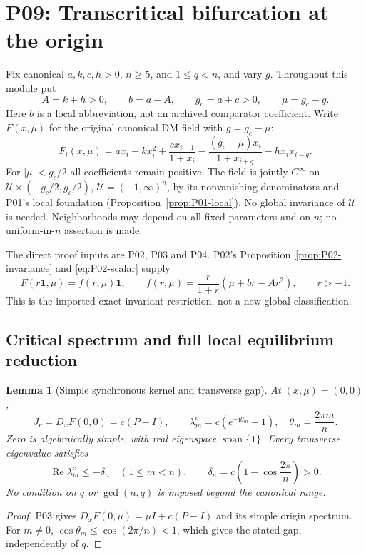 \documentclass[11pt]{article}
\newcommand{\one}{\mathbf{1}}
\newcommand{\ii}{\mathrm{i}}
\newcommand{\Domain}{\mathcal{U}}
\DeclareMathOperator{\Ree}{Re}
\newtheorem{lemma}[theorem]{Lemma}
\theoremstyle{definition}
\theoremstyle{remark}
\begin{document}
\section{P09: Transcritical bifurcation at the origin}
\label{sec:P09}

Fix canonical $a,k,c,h>0$, $n\ge5$, and $1\le q<n$, and vary $g$.
Throughout this module put
\begin{equation}
 A=k+h>0,\qquad b=a-A,\qquad g_c=a+c>0,\qquad \mu=g_c-g.
 \label{eq:P09-parameters}
\end{equation}
Here $b$ is a local abbreviation, not an archived comparator coefficient.
Write $F(x,\mu)$ for the original canonical DM field with $g=g_c-\mu$:
\begin{equation}
 F_i(x,\mu)=a x_i-kx_i^2+\frac{c x_{i-1}}{1+x_i}
 -\frac{(g_c-\mu)x_i}{1+x_{i+q}}-h x_i x_{i-q}.
 \label{eq:P09-field}
\end{equation}
For $|\mu|<g_c/2$ all coefficients remain positive. The field is jointly
$C^\infty$ on $\Domain\times(-g_c/2,g_c/2)$,
$\Domain=(-1,\infty)^n$, by its nonvanishing denominators and P01's
local foundation (Proposition~\ref{prop:P01-local}). No global invariance
of $\Domain$ is needed. Neighborhoods may depend on all fixed parameters
and on $n$; no uniform-in-$n$ assertion is made.

The direct proof inputs are P02, P03 and P04. P02's
Proposition~\ref{prop:P02-invariance} and \eqref{eq:P02-scalar} supply
\begin{equation}
 F(r\one,\mu)=f(r,\mu)\one,\qquad
 f(r,\mu)=\frac{r}{1+r}(\mu+br-Ar^2),\qquad r>-1.
 \label{eq:P09-scalar}
\end{equation}
This is the imported exact invariant restriction, not a new global
classification.

\subsection{Critical spectrum and full local equilibrium reduction}
\label{slot:P09-1}

\begin{lemma}[Simple synchronous kernel and transverse gap]
\label{lem:P09-gap}
At $(x,\mu)=(0,0)$,
\begin{equation}
 J_c=D_xF(0,0)=c(P-I),\qquad
 \lambda_m^c=c(e^{-\ii\theta_m}-1),\quad \theta_m=\frac{2\pi m}{n}.
 \label{eq:P09-critical-spectrum}
\end{equation}
Zero is algebraically simple, with real eigenspace
$\operatorname{span}\{\one\}$. Every transverse eigenvalue satisfies
\begin{equation}
 \Ree\lambda_m^c\le-\delta_n\quad(1\le m<n),\qquad
 \delta_n=c\left(1-\cos\frac{2\pi}{n}\right)>0.
 \label{eq:P09-gap}
\end{equation}
No condition on $q$ or $\gcd(n,q)$ is imposed beyond the canonical range.
\end{lemma}
\begin{proof}
P03 gives $D_xF(0,\mu)=\mu I+c(P-I)$ and its simple origin
spectrum. For $m\ne0$, $\cos\theta_m\le\cos(2\pi/n)<1$,
which gives the stated gap, independently of $q$.
\end{proof}
\end{document}
